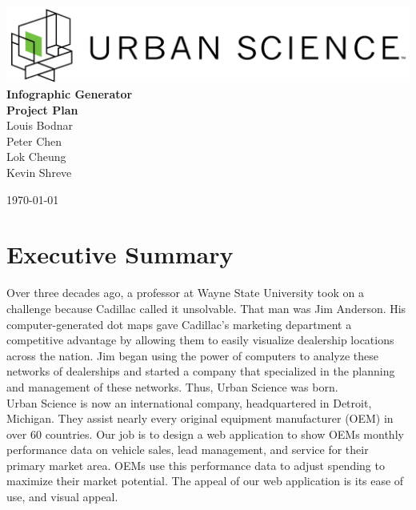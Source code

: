 \documentclass[11pt,a4paper,oneside]{article}
\begin{document}
\begin{titlepage}



\begin{center}

\includegraphics[width=1\textwidth]{images/sponsor-logo.png}\\[1cm]    

{ \huge \bfseries Infographic Generator}\\[0.4cm]
{ \large \bfseries Project Plan}\\[0.4cm]

Louis Bodnar\\
Peter Chen\\
Lok Cheung\\
Kevin Shreve\\



\vfill

{\large \today}

\end{center}

\end{titlepage}

\tableofcontents

\newpage

\listoffigures

\newpage

\section{Executive Summary}


Over three decades ago, a professor at Wayne State University took on a challenge because Cadillac called it unsolvable.  That man was Jim Anderson.  His computer-generated dot maps gave Cadillac's marketing department a competitive advantage by allowing them to easily visualize dealership locations across the nation.  Jim began using the power of computers to analyze these networks of dealerships and started a company that specialized in the planning and management of these networks.  Thus, Urban Science was born.\\


Urban Science is now an international company, headquartered in Detroit, Michigan.  They assist nearly every original equipment manufacturer (OEM) in over 60 countries.  Our job is to design a web application to show OEMs monthly performance data on vehicle sales, lead management, and service for their primary market area.  OEMs use this performance data to adjust spending to maximize their market potential.  The appeal of our web application is its ease of use, and visual appeal.\\
\end{document}
